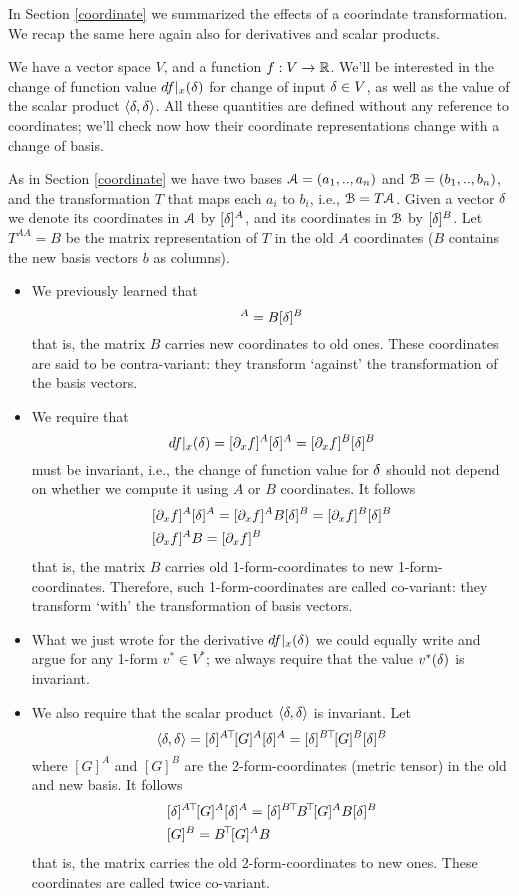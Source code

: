 In Section \ref{coordinate} we summarized the effects of a coorindate transformation. We recap the same here again also for derivatives and scalar products.

We have a vector space $V$, and a function $f: V \to \RRR$. We'll be interested in the change of function value $df|_x (\d)$ for change of input $\d\in V$, as well as the value of the scalar product $\<\d, \d\>$. All these quantities are defined without any reference to coordinates; we'll check now how their coordinate representations change with a change of basis.

As in Section \ref{coordinate} we have two bases $\AA=(a_1,..,a_n)$ and $\BB=(b_1,..,b_n)$, and the transformation $T$ that maps each $a_i$ to $b_i$, i.e., $\BB = T \AA$. Given a vector $\d$ we denote its coordinates in $\AA$  by $[\d]^A$, and its coordinates in $\BB$ by $[\d]^B$. Let $T^{AA} = B$ be the matrix representation of $T$ in the old $A$ coordinates ($B$ contains the new basis vectors $b$ as columns).
\begin{itemize}
\item We previously learned that
 \begin{equation}
[\d]^A = B [\d]^B
\end{equation}
  that is, the matrix $B$ carries new coordinates to old ones. These coordinates are said to be contra-variant: they transform `against' the transformation of the basis vectors.
\item We require that
 \begin{equation}
df|_x (\d) = [\del_x f]^A [\d]^A = [\del_x f]^B [\d]^B
\end{equation}
  must be invariant, i.e., the change of function value for $\d$ should not depend on whether we compute it using $A$ or $B$ coordinates. It follows
  \begin{align}
  &  [\del_x f]^A [\d]^A = [\del_x f]^A B [\d]^B = [\del_x f]^B [\d]^B \\
  &  [\del_x f]^A B = [\del_x f]^B
  \end{align}
  that is, the matrix $B$ carries old 1-form-coordinates to new 1-form-coordinates. Therefore, such 1-form-coordinates are called co-variant: they transform `with' the transformation of basis vectors.
\item What we just wrote for the derivative $df|_x (\d)$ we could equally write and argue for any 1-form $v^*\in V^*$; we always require that the value $v^*(\d)$ is invariant.
\item We also require that the scalar product $\<\d,\d\>$ is invariant. Let
\begin{equation}
\<\d,\d\> = [\d]^A {}^\T [G]^A [\d]^A = [\d]^B {}^\T [G]^B [\d]^B
\end{equation}
  where $[G]^A$ and $[G]^B$ are the 2-form-coordinates (metric tensor) in the old and new basis. It follows
\begin{align}
 & [\d]^A {}^\T [G]^A [\d]^A = [\d]^B {}^\T B^\T [G]^A B [\d]^B \\
 & [G]^B = B^\T [G]^A B
\end{align}
that is, the matrix carries the old 2-form-coordinates to new ones. These coordinates are called twice co-variant.
\end{itemize}    
  
